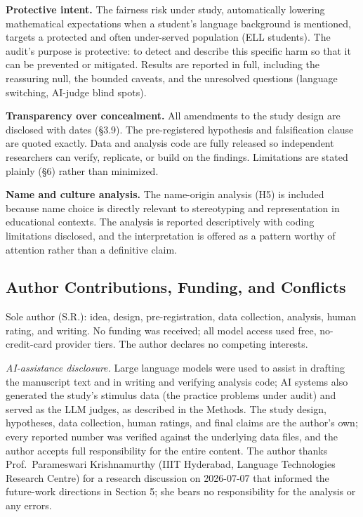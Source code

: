 \documentclass[
]{article}
\begin{document}
\textbf{Protective intent.} The fairness risk under study, automatically
lowering mathematical expectations when a student's language background
is mentioned, targets a protected and often under-served population (ELL
students). The audit's purpose is protective: to detect and describe
this specific harm so that it can be prevented or mitigated. Results are
reported in full, including the reassuring null, the bounded caveats,
and the unresolved questions (language switching, AI-judge blind spots).

\textbf{Transparency over concealment.} All amendments to the study
design are disclosed with dates (§3.9). The pre-registered hypothesis
and falsification clause are quoted exactly. Data and analysis code are
fully released so independent researchers can verify, replicate, or
build on the findings. Limitations are stated plainly (§6) rather than
minimized.

\textbf{Name and culture analysis.} The name-origin analysis (H5) is
included because name choice is directly relevant to stereotyping and
representation in educational contexts. The analysis is reported
descriptively with coding limitations disclosed, and the interpretation
is offered as a pattern worthy of attention rather than a definitive
claim.

\hypertarget{author-contributions-funding-and-conflicts}{%
\subsection{Author Contributions, Funding, and
Conflicts}\label{author-contributions-funding-and-conflicts}}

Sole author (S.R.): idea, design, pre-registration, data collection,
analysis, human rating, and writing. No funding was received; all model
access used free, no-credit-card provider tiers. The author declares no
competing interests.

\emph{AI-assistance disclosure.} Large language models were used to
assist in drafting the manuscript text and in writing and verifying
analysis code; AI systems also generated the study's stimulus data (the
practice problems under audit) and served as the LLM judges, as
described in the Methods. The study design, hypotheses, data collection,
human ratings, and final claims are the author's own; every reported
number was verified against the underlying data files, and the author
accepts full responsibility for the entire content. The author thanks
Prof.~Parameswari Krishnamurthy (IIIT Hyderabad, Language Technologies
Research Centre) for a research discussion on 2026-07-07 that informed
the future-work directions in Section 5; she bears no responsibility for
the analysis or any errors.
\end{document}
